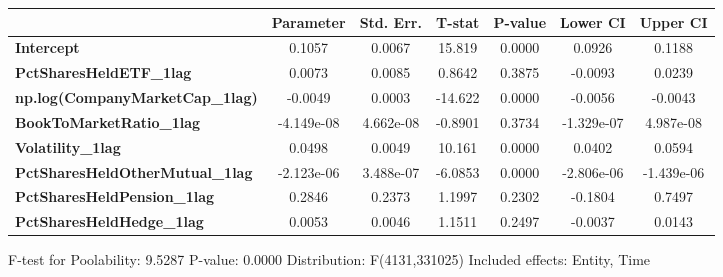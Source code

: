 \begin{center}
\begin{tabular}{lclc}
\bottomrule
\end{tabular}
\begin{tabular}{lcccccc}
                                        & \textbf{Parameter} & \textbf{Std. Err.} & \textbf{T-stat} & \textbf{P-value} & \textbf{Lower CI} & \textbf{Upper CI}  \\
\midrule
\textbf{Intercept}                      &       0.1057       &       0.0067       &      15.819     &      0.0000      &       0.0926      &       0.1188       \\
\textbf{PctSharesHeldETF\_1lag}         &       0.0073       &       0.0085       &      0.8642     &      0.3875      &      -0.0093      &       0.0239       \\
\textbf{np.log(CompanyMarketCap\_1lag)} &      -0.0049       &       0.0003       &     -14.622     &      0.0000      &      -0.0056      &      -0.0043       \\
\textbf{BookToMarketRatio\_1lag}        &     -4.149e-08     &     4.662e-08      &     -0.8901     &      0.3734      &     -1.329e-07    &     4.987e-08      \\
\textbf{Volatility\_1lag}               &       0.0498       &       0.0049       &      10.161     &      0.0000      &       0.0402      &       0.0594       \\
\textbf{PctSharesHeldOtherMutual\_1lag} &     -2.123e-06     &     3.488e-07      &     -6.0853     &      0.0000      &     -2.806e-06    &     -1.439e-06     \\
\textbf{PctSharesHeldPension\_1lag}     &       0.2846       &       0.2373       &      1.1997     &      0.2302      &      -0.1804      &       0.7497       \\
\textbf{PctSharesHeldHedge\_1lag}       &       0.0053       &       0.0046       &      1.1511     &      0.2497      &      -0.0037      &       0.0143       \\
\bottomrule
\end{tabular}
\end{center}

F-test for Poolability: 9.5287 \newline
 P-value: 0.0000 \newline
 Distribution: F(4131,331025) \newline
  \newline
 Included effects: Entity, Time